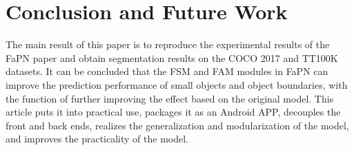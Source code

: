\section{Conclusion and Future Work}



The main result of this paper is to reproduce the experimental results of the FaPN paper and obtain segmentation results on the COCO 2017 and TT100K datasets. It can be concluded that the FSM and FAM modules in FaPN can improve the prediction performance of small objects and object boundaries, with the function of further improving the effect based on the original model. This article puts it into practical use, packages it as an Android APP, decouples the front and back ends, realizes the generalization and modularization of the model, and improves the practicality of the model.


